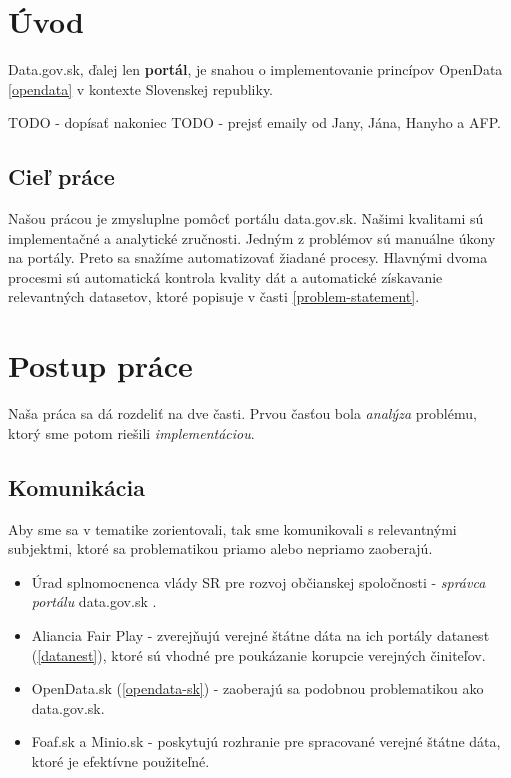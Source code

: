 \documentclass[12pt,a4paper]{article}
\begin{document}
\newpage

\section{Úvod}

Data.gov.sk, ďalej len {\bf portál}, je snahou o implementovanie princípov OpenData \ref{opendata} v kontexte Slovenskej republiky. 

TODO - dopísať nakoniec 
TODO - prejsť emaily od Jany, Jána, Hanyho a AFP. 

\subsection{Cieľ práce}
Našou prácou je zmysluplne pomôcť portálu data.gov.sk. Našimi kvalitami sú implementačné a analytické zručnosti. Jedným z problémov sú manuálne úkony na portály. Preto sa snažíme automatizovať žiadané procesy. Hlavnými dvoma procesmi sú automatická kontrola kvality dát a automatické získavanie relevantných datasetov, ktoré popisuje v časti \ref{problem-statement}. 


\section{Postup práce}
Naša práca sa dá rozdeliť na dve časti. Prvou časťou bola \emph{analýza} problému, ktorý sme potom riešili \emph{implementáciou}. 

\subsection{Komunikácia}
Aby sme sa v tematike zorientovali, tak sme komunikovali s relevantnými subjektmi, ktoré sa problematikou priamo alebo nepriamo zaoberajú. 

\begin{itemize} 
  \item Úrad splnomocnenca vlády SR pre rozvoj občianskej spoločnosti - \emph{správca portálu} data.gov.sk .
  \item Aliancia Fair Play - zverejňujú verejné štátne dáta na ich portály datanest (\ref{datanest}), ktoré sú vhodné pre poukázanie korupcie verejných činiteľov. 
  \item OpenData.sk (\ref{opendata-sk}) - zaoberajú sa podobnou problematikou ako data.gov.sk. 
  \item Foaf.sk a Minio.sk - poskytujú rozhranie pre spracované verejné štátne dáta, ktoré je efektívne použiteľné.  
\end{itemize} 
\end{document}

